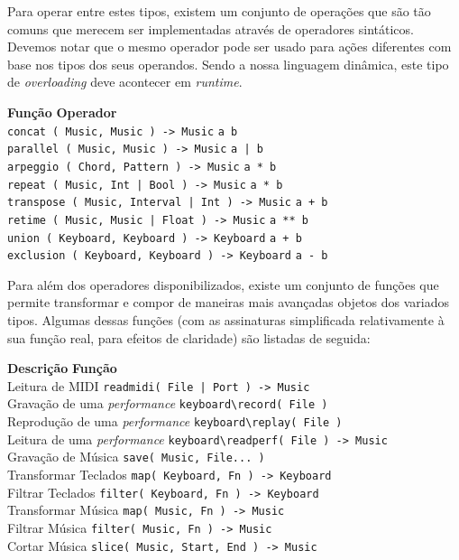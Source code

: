\medskip

Para operar entre estes tipos, existem um conjunto de operações que são tão comuns que merecem ser implementadas através de operadores sintáticos. Devemos notar que o mesmo operador pode ser usado para ações diferentes com base nos tipos dos seus operandos. Sendo a nossa linguagem dinâmica, este tipo de \textit{overloading} deve acontecer em \textit{runtime}.

\medskip
\noindent
\textbf{Função} \hfill \textbf{Operador} \ \ \\
\texttt{concat ( Music, Music ) -> Music} \dotfill \texttt{a b} \\
\texttt{parallel ( Music, Music ) -> Music} \dotfill \texttt{a | b} \\
\texttt{arpeggio ( Chord, Pattern ) -> Music} \dotfill \texttt{a * b} \\
\texttt{repeat ( Music, Int | Bool ) -> Music} \dotfill \texttt{a * b} \\ 
\texttt{transpose ( Music, Interval | Int ) -> Music} \dotfill \texttt{a + b} \\
\texttt{retime ( Music, Music | Float ) -> Music} \dotfill \texttt{a ** b} \\
\texttt{union ( Keyboard, Keyboard ) -> Keyboard} \dotfill \texttt{a + b} \\
\texttt{exclusion ( Keyboard, Keyboard ) -> Keyboard} \dotfill \texttt{a - b} 

\medskip

Para além dos operadores disponibilizados, existe um conjunto de funções que permite transformar e compor de maneiras mais avançadas objetos dos variados tipos. Algumas dessas funções (com as assinaturas simplificada relativamente à sua função real, para efeitos de claridade) são listadas de seguida:

\medskip
\noindent
\textbf{Descrição} \hfill \textbf{Função} \ \ \\
Leitura de MIDI \dotfill \texttt{readmidi( File | Port ) -> Music} \\
Gravação de uma \textit{performance} \dotfill \texttt{keyboard\textbackslash{}record( File )} \\
Reprodução de uma \textit{performance} \dotfill \texttt{keyboard\textbackslash{}replay( File )} \\
Leitura de uma \textit{performance} \dotfill \texttt{keyboard\textbackslash{}readperf( File ) -> Music} \\
Gravação de Música \dotfill \texttt{save( Music, File... )} \\
Transformar Teclados \dotfill \texttt{map( Keyboard, Fn ) -> Keyboard} \\
Filtrar Teclados \dotfill \texttt{filter( Keyboard, Fn ) -> Keyboard} \\
Transformar Música \dotfill \texttt{map( Music, Fn ) -> Music} \\
Filtrar Música \dotfill \texttt{filter( Music, Fn ) -> Music} \\
Cortar Música \dotfill \texttt{slice( Music, Start, End ) -> Music} 
